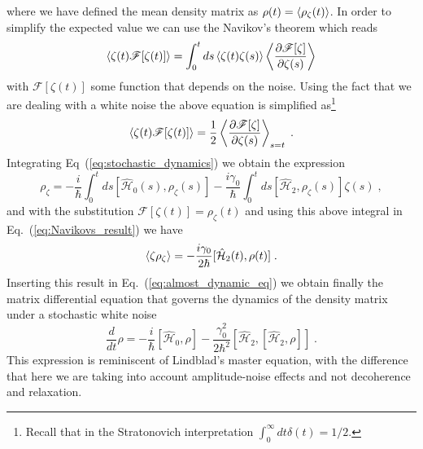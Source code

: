 where we have defined the mean density matrix as $\rho(t)=\expval{\rho_\zeta(t)}$. In order to simplify the expected value we can use the Navikov's theorem which reads
\begin{equation}
	\expval{\zeta(t)\mathscr{F}[\zeta(t)]}=\int_0^tds\expval{\zeta(t)\zeta(s)}\expval{\frac{\partial\mathscr{F}[\zeta]}{\partial\zeta(s)}}
\end{equation}
with $\mathscr{F}[\zeta(t)]$ some function that depends on the noise. Using the fact that we are dealing with a white noise the above equation is simplified as\footnote{Recall that in the Stratonovich interpretation $\int_0^\infty dt\delta (t)=1/2$.}
\begin{equation}
	\expval{\zeta(t)\mathscr{F}[\zeta(t)]}=\frac{1}{2}\expval{\frac{\partial\mathscr{F}[\zeta]}{\partial \zeta(s)}}_{s=t}\; .
	\label{eq:Navikovs_result}
\end{equation}
Integrating Eq~(\ref{eq:stochastic_dynamics}) we obtain the expression
\begin{equation}
	\rho_\zeta=-\frac{i}{\hbar}\int_0^tds[\hat{\mathcal{H}}_0(s),\rho_\zeta(s)]-\frac{i\gamma_0}{\hbar}\int_0^tds[\hat{\mathcal{H}}_2,\rho_\zeta(s)]\zeta(s)\; ,
\end{equation}
and with the substitution $\mathscr{F}[\zeta(t)]=\rho_\zeta(t)$ and using this above integral in Eq.~(\ref{eq:Navikovs_result}) we have
\begin{equation}
	\expval{\zeta\rho_\zeta}=-\frac{i\gamma_0}{2\hbar}[\hat{\mathcal{H}}_2(t),\rho(t)]\; .
\end{equation}
Inserting this result in Eq.~(\ref{eq:almost_dynamic_eq}) we obtain finally the matrix differential equation that governs the dynamics of the density matrix under a stochastic white noise
\begin{equation}
	\frac{d}{dt}\rho=-\frac{i}{\hbar}[\hat{\mathcal{H}}_0,\rho]-\frac{\gamma_0^2}{2\hbar^2}[\hat{\mathcal{H}}_2,[\hat{\mathcal{H}}_2,\rho]]\; .
\end{equation}
This expression is reminiscent of Lindblad's master equation, with the difference that here we are taking into account amplitude-noise effects and not decoherence and relaxation.







